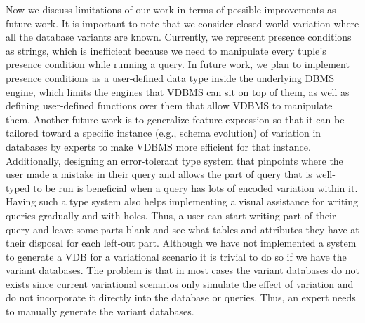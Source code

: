 Now we discuss limitations of our work in terms of possible improvements 
as future work.
It is important to note that we consider closed-world variation where
all the database variants are known.
%
%
Currently, we represent presence conditions as strings, which is
inefficient because we need to manipulate every tuple's 
presence condition while running a 
query. In future work, we plan to implement presence conditions as a 
user-defined data type inside the underlying DBMS engine, which
limits the engines that VDBMS can sit on top of them, as well as
defining user-defined functions over them that allow VDBMS to
manipulate them. 
%
Another future work is to generalize feature 
expression so that it can be tailored toward a specific instance (e.g., schema evolution)
of variation in databases by experts to make VDBMS more
efficient for that instance.
%
Additionally, designing an error-tolerant type system that pinpoints
where the user made a mistake in their query and allows the part of
query that is well-typed to be run is beneficial when a query has lots of 
encoded variation within it. 
Having such a type system also helps implementing a visual 
assistance for writing queries gradually and with holes. Thus, a user
can start writing part of their query and leave some parts blank and 
see what tables and attributes they have at their disposal for each 
left-out part. 
%
Although we have not implemented a system to generate a VDB for 
a variational scenario it is trivial to do so if we have the variant databases.
The problem is that in most cases the variant databases do not exists
since current variational scenarios only simulate the effect of variation
and do not incorporate it directly into the database or queries.
Thus, an expert needs to manually generate the variant databases.


